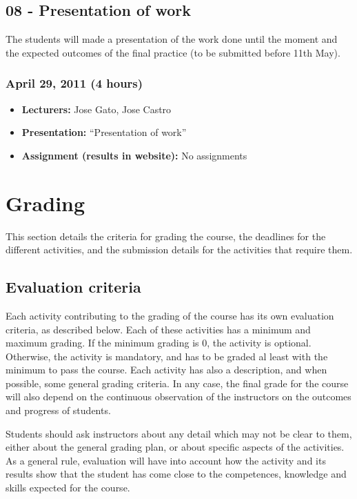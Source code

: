 \documentclass[a4paper]{article}
\begin{document}
\subsection{08 - Presentation of work}

The students will made a presentation of the work done until the moment and the expected outcomes of the final practice (to be submitted before 11th May). 

\subsubsection{April 29, 2011 (4 hours)}

\begin{itemize}
\item \textbf{Lecturers:} Jose Gato, Jose Castro
\item \textbf{Presentation:} ``Presentation of work''
\item \textbf{Assignment (results in website):} No assignments
\end{itemize}





\section{Grading}

This section details the criteria for grading the course, the
deadlines for the different activities, and the submission details for
the activities that require them.

\subsection{Evaluation criteria}
\label{sub:evaluation-criteria}

Each activity contributing to the grading of the course has its own
evaluation criteria, as described below. Each of these activities has
a minimum and maximum grading. If the minimum grading is 0, the
activity is optional. Otherwise, the activity is mandatory, and has to
be graded al least with the minimum to pass the course. Each activity
has also a description, and when possible, some general grading
criteria. In any case, the final grade for the course will also depend
on the continuous observation of the instructors on the outcomes and
progress of students.

Students should ask instructors about any detail which may not be
clear to them, either about the general grading plan, or about
specific aspects of the activities. As a general rule, evaluation will
have into account how the activity and its results show that the
student has come close to the competences, knowledge and skills
expected for the course.
\end{document}
